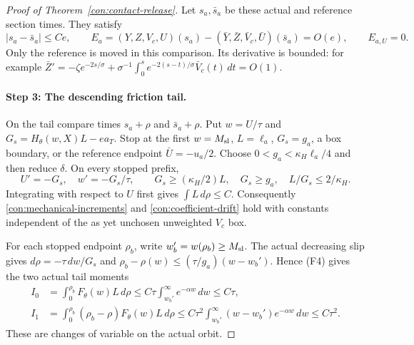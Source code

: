 \begin{proof}[Proof of Theorem~\ref{con:contact-release}]
Let $s_a,\bar s_a$ be these actual and reference section times.
They satisfy
\begin{equation}
 |s_a-\bar s_a|\le Ce,\qquad
 E_a=(Y,Z,V_c,U)(s_a)-
       (\bar Y,\bar Z,\bar V_c,\bar U)(\bar s_a)=O(e),
 \qquad E_{a,U}=0.
 \label{con:section-error}
\end{equation}
Only the reference is moved in this comparison.  Its derivative is
bounded: for example
$\bar Z'=-\zeta e^{-2s/\sigma}
+\sigma^{-1}\int_0^s e^{-2(s-t)/\sigma}\bar V_c(t)\,dt=O(1)$.

\paragraph{Step 3: The descending friction tail.}
On the tail compare times $s_a+\rho$ and $\bar s_a+\rho$.
Put $w=U/\tau$ and $G_s=H_\theta(w,X)L-ea_T$.
Stop at the first $w=M_{\rm sl}$, $L=\ell_a$, $G_s=g_a$, a box boundary,
or the reference endpoint $\bar U=-u_a/2$.  Choose
$0<g_a<\kappa_H\ell_a/4$ and then reduce $\delta$.  On every stopped
prefix,
\begin{equation}
 U'=-G_s,\quad w'=-G_s/\tau,\qquad
 G_s\ge(\kappa_H/2)L,\quad G_s\ge g_a,
 \quad L/G_s\le2/\kappa_H.
 \label{con:actual-tail}
\end{equation}
Integrating with respect to $U$ first gives $\int L\,d\rho\le C$.
Consequently \eqref{con:mechanical-increments} and
\eqref{con:coefficient-drift} hold with constants independent of the
as yet unchosen unweighted $V_c$ box.

For each stopped endpoint $\rho_b$, write $w_b'=w(\rho_b)\ge M_{\rm sl}$.
The actual decreasing slip gives
$d\rho=-\tau\,dw/G_s$ and
$\rho_b-\rho(w)\le(\tau/g_a)(w-w_b')$.  Hence (F4) gives the two
actual tail moments
\begin{equation}
 \begin{aligned}
 I_0&=\int_0^{\rho_b}F_\theta(w)L\,d\rho
       \le C\tau\int_{w_b'}^\infty e^{-\alpha w}\,dw\le C\tau,\\
 I_1&=\int_0^{\rho_b}(\rho_b-\rho)F_\theta(w)L\,d\rho
       \le C\tau^2\int_{w_b'}^\infty(w-w_b')e^{-\alpha w}\,dw
       \le C\tau^2.
 \end{aligned}
 \label{con:tail-moments}
\end{equation}
These are changes of variable on the actual orbit.


\end{proof}
